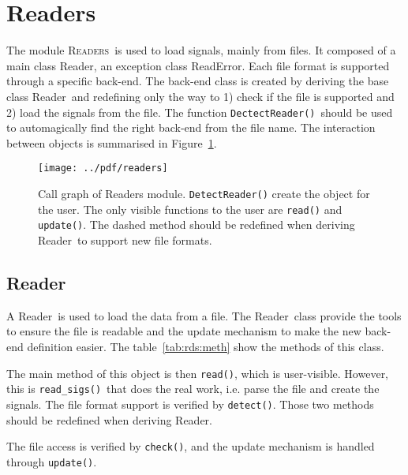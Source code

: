 \documentclass[a4paper,11pt]{article}
\newcommand{\meth}[1]{\texttt{#1()}}
\newcommand{\rds}{\textsf{Reader}}
\newcommand{\rdserr}{\textsf{ReadError}}
\newcommand{\module}[1]{\textsc{#1}}
\begin{document}
\section{Readers}
\label{sec:readers}
The module \module{Readers}\ is used to load signals, mainly from files.
It composed of a main class \rds, an exception class \rdserr.
Each file format is supported through a specific back-end.
The back-end class is created by deriving the base class \rds\ and redefining only the way to 1) check if the file is supported and 2) load the signals from the file.
The function \meth{DectectReader}\ should be used to automagically find the right back-end from the file name.
The interaction between objects is summarised in Figure~\ref{fig:rds:callgraph}.

\begin{figure}[htbp]
  \centering
  \texttt{[image: ../pdf/readers]}
  \caption{Call graph of Readers module. \meth{DetectReader} create the object for the user. The only visible functions to the user are \meth{read} and \meth{update}. The dashed method should be redefined when deriving \rds\ to support new file formats.}
  \label{fig:rds:callgraph}
\end{figure}

\subsection{Reader}
\label{sec:readers:reader}
 
A \rds\ is used to load the data from a file.
The \rds\ class provide the tools to ensure the file is readable and the update mechanism to make the new back-end definition easier.
The table~\ref{tab:rds:meth} show the methods of this class.

The main method of this object is then \meth{read}, which is user-visible.
However, this is \meth{read\_sigs}\ that does the real work, i.e. parse the file and create the signals.
The file format support is verified by \meth{detect}.
Those two methods should be redefined when deriving \rds.

The file access is verified by \meth{check}, and the update mechanism is handled through \meth{update}.
\end{document}
